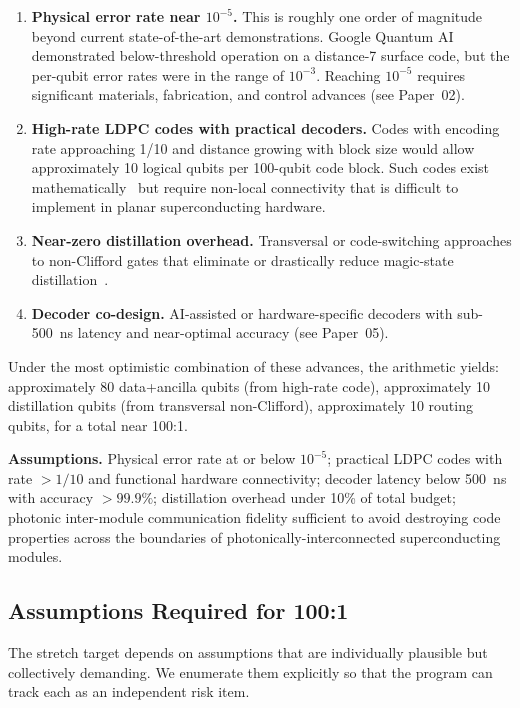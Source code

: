 \documentclass[conference]{IEEEtran}
\begin{document}
\begin{enumerate}
\item \textbf{Physical error rate near $10^{-5}$.} This is roughly one order of magnitude beyond current state-of-the-art demonstrations. Google Quantum AI~\cite{googleqai2024} demonstrated below-threshold operation on a distance-7 surface code, but the per-qubit error rates were in the range of $10^{-3}$. Reaching $10^{-5}$ requires significant materials, fabrication, and control advances (see Paper~02).

\item \textbf{High-rate LDPC codes with practical decoders.} Codes with encoding rate approaching 1/10 and distance growing with block size would allow approximately 10 logical qubits per 100-qubit code block. Such codes exist mathematically~\cite{panteleev2022} but require non-local connectivity that is difficult to implement in planar superconducting hardware.

\item \textbf{Near-zero distillation overhead.} Transversal or code-switching approaches to non-Clifford gates that eliminate or drastically reduce magic-state distillation~\cite{chamberland2022}.

\item \textbf{Decoder co-design.} AI-assisted or hardware-specific decoders with sub-500~ns latency and near-optimal accuracy (see Paper~05).
\end{enumerate}

Under the most optimistic combination of these advances, the arithmetic yields: approximately 80 data+ancilla qubits (from high-rate code), approximately 10 distillation qubits (from transversal non-Clifford), approximately 10 routing qubits, for a total near 100:1.

\textbf{Assumptions.} Physical error rate at or below $10^{-5}$; practical LDPC codes with rate $> 1/10$ and functional hardware connectivity; decoder latency below 500~ns with accuracy $> 99.9\%$; distillation overhead under 10\% of total budget; photonic inter-module communication fidelity sufficient to avoid destroying code properties across the boundaries of photonically-interconnected superconducting modules.

\subsection{Assumptions Required for 100:1}

The stretch target depends on assumptions that are individually plausible but collectively demanding. We enumerate them explicitly so that the program can track each as an independent risk item.
\end{document}
